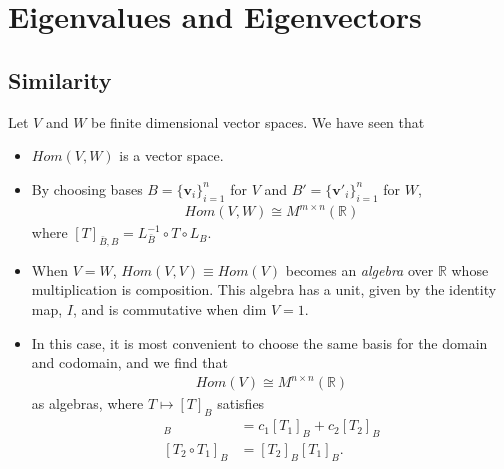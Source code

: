 \documentclass[12pt,letterpaper,reqno]{article}
\numberwithin{equation}{section}
\newcommand{\bv}{\mathbf{v}}
\begin{document}
\section{Eigenvalues and Eigenvectors}\label{sec:eigen}
\subsection{Similarity}
Let $V$ and $W$ be finite dimensional vector spaces. We have seen that 
\begin{itemize}
	\item $Hom(V,W)$ is a vector space.
	\item  By choosing bases $B=\{\bv_i\}_{i=1}^n$ for $V$ and $B'=\{\bv'_i\}_{i=1}^n$ for $W$, 
	\begin{align*}
		Hom(V,W) \cong M^{m \times n}(\mathbb{R})
	\end{align*}
	where $[T]_{\bar{B},B}=L_{\bar{B}}^{-1} \circ T \circ L_B$.
	\item When $V=W$, $Hom(V,V) \equiv Hom(V)$ becomes an \emph{algebra} over $\mathbb{R}$ whose multiplication is composition. This algebra has a unit, given by the identity map, $I$, and is commutative when $\text{dim }V=1$.
	\item In this case, it is most convenient to choose the same basis for the domain and codomain, and we find that 
	\begin{align*}
		Hom(V) \cong M^{n \times n}(\mathbb{R})
	\end{align*}
	as algebras, where $T \mapsto [T]_B$ satisfies
	\begin{align*}
	[c_1T_1+c_2T_2]_B&=c_1[T_1]_B+c_2[T_2]_B \\
		[T_2 \circ T_1]_B&=[T_2]_B[T_1]_B.
	\end{align*}
\end{itemize}
\end{document}
